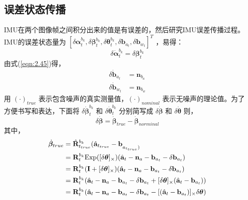 \subsection{误差状态传播}
\label{chap:3.2.3}
IMU在两个图像帧之间积分出来的值是有误差的，然后研究IMU误差传播过程。IMU的误差状态量为 $[ \delta{\bm{\alpha}}_t^{b_k},\delta{\bm{\beta}}_t^{b_k},
\delta{\bm{\theta}}_t^{b_k} ,\delta{\mathbf{b}}_{a_t} ,\delta{\mathbf{b}}_{w_t} ] ^T$ ，易得：
\begin{equation}
\label{eqn:3.21}
\delta \dot{\bm{\alpha}}_t^{b_k} = \delta \bm{\beta}_t^{b_k}
\end{equation}
由式(\ref{eqn:2.45})得，
\begin{equation}
\label{eqn:3.22}
\begin{aligned}
\delta \dot{\mathbf{b}}_{a_t} &= \mathbf{n}_{b_a} \\
\delta \dot{\mathbf{b}}_{w_t} &= \mathbf{n}_{b_w}
\end{aligned}
\end{equation}
用 $(\cdot)_{true} $ 表示包含噪声的真实测量值，$(\cdot)_{nominal} $ 表示无噪声的理论值。为了方便书写和表达，下面将 $\delta \dot{\bm{\beta}}_t^{b_k}  $ 和 $\delta \dot{\bm{\theta}}_t^{b_k}  $ 分别简写成 $\delta \dot{\bm{\beta}} $ 和 $\delta \dot{\bm{\theta}} $ 则，
\begin{equation}
\label{eqn:3.23}
\delta \dot{\bm{\beta}} = \dot{\bm{\beta}}_{true} - \dot{\bm{\beta}}_{norminal}
\end{equation}
其中，
\begin{equation}
\label{eqn:3.24}
\begin{aligned}
\dot{\bm{\beta}}_{true} &= \hat{\mathbf{R}}_{t_{true}}^{b_k} ( \hat{\mathbf{a}}_{t_{true}} - \mathbf{b}}_{a_{t_{true}}) \\
&= \mathbf{R}_t^{b_k} \text{Exp}( [\delta \bm{\theta}]_{\times} ) ( \hat{\mathbf{a}}_t - \mathbf{n}_a - \mathbf{b}_{a_t} - \delta\mathbf{b}_{a_t} ) \\
&= \mathbf{R}_t^{b_k} (\mathbf{I}+[\delta \bm{\theta}]_{\times} )(\hat{\mathbf{a}}_t - \mathbf{n}_a - \mathbf{b}_{a_t} - \delta\mathbf{b}_{a_t}  ) \\
&= \mathbf{R}_t^{b_k} ( \hat{\mathbf{a}}_t - \mathbf{n}_a - \mathbf{b}_{a_t} - \delta\mathbf{b}_{a_t} + [\delta \bm{\theta}]_{\times} (\hat{\mathbf{a}}_t - \mathbf{b}_{a_t} )) \\
&= \mathbf{R}_t^{b_k} ( \hat{\mathbf{a}}_t - \mathbf{n}_a - \mathbf{b}_{a_t} - \delta\mathbf{b}_{a_t} - [(\hat{\mathbf{a}}_t - \mathbf{b}_{a_t}) ]_{\times} \delta \bm{\theta} ) 
\end{aligned}
\end{equation}

